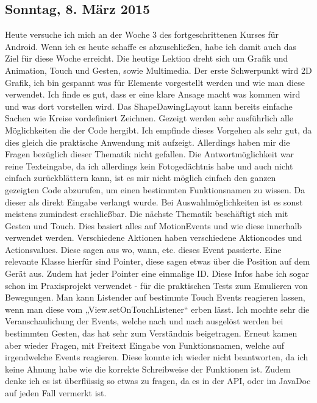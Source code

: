 \documentclass[12pt,a4paper,bibliography=totocnumbered,listof=totocnumbered]{scrartcl}
\begin{document}
\subsection{Sonntag, 8. März 2015}
Heute versuche ich mich an der Woche 3 des fortgeschrittenen Kurses für Android. Wenn ich es heute schaffe es abzuschließen, habe ich damit auch das Ziel für diese Woche erreicht. 
Die heutige Lektion dreht sich um Grafik und Animation, Touch und Gesten, sowie Multimedia. 
Der erste Schwerpunkt wird 2D Grafik, ich bin gespannt was für Elemente vorgestellt werden und wie man diese verwendet.
Ich finde es gut, dass er eine klare Ansage macht was kommen wird und was dort vorstellen wird. Das ShapeDawingLayout kann bereits einfache Sachen wie Kreise vordefiniert Zeichnen. Gezeigt werden sehr ausführlich alle Möglichkeiten die der Code hergibt. Ich empfinde dieses Vorgehen als sehr gut, da dies gleich die praktische Anwendung mit aufzeigt. Allerdings haben mir die Fragen bezüglich dieser Thematik nicht gefallen. Die Antwortmöglichkeit war reine Texteingabe, da ich allerdings kein Fotogedächtnis habe und auch nicht einfach zurückblättern kann, ist es mir nicht möglich einfach den ganzen gezeigten Code abzurufen, um einen bestimmten Funktionsnamen zu wissen. Da dieser als direkt Eingabe verlangt wurde. Bei Auswahlmöglichkeiten ist es sonst meistens zumindest erschließbar. 
Die nächste Thematik beschäftigt sich mit Gesten und Touch. Dies basiert alles auf MotionEvents und wie diese innerhalb verwendet werden. Verschiedene Aktionen haben verschiedene Aktioncodes und Actionsvalues. Diese sagen aus wo, wann, etc. dieses Event passierte. Eine relevante Klasse hierfür sind Pointer, diese sagen etwas über die Position auf dem Gerät aus. Zudem hat jeder Pointer eine einmalige ID. Diese Infos habe ich sogar schon im Praxisprojekt verwendet - für die praktischen Tests zum Emulieren von Bewegungen. Man kann Listender auf bestimmte Touch Events reagieren lassen, wenn man diese vom „View.setOnTouchListener“ erben lässt. 
Ich mochte sehr die Veranschaulichung der Events, welche nach und nach ausgelöst werden bei bestimmten Gesten, das hat sehr zum Verständnis beigetragen. Erneut kamen aber wieder Fragen, mit Freitext Eingabe von Funktionsnamen, welche auf irgendwelche Events reagieren. Diese konnte ich wieder nicht beantworten, da ich keine Ahnung habe wie die korrekte Schreibweise der Funktionen ist. Zudem denke ich es ist überflüssig so etwas zu fragen, da es in der API, oder im JavaDoc auf jeden Fall vermerkt ist. 
\end{document}
